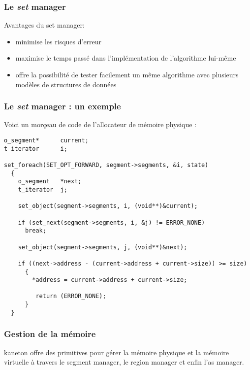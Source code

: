 
\begin{frame}
  \frametitle{Le \emph{set} manager}

  Avantages du set manager:

  \begin{itemize}
    \item
    minimise les risques d'erreur
    \item
    maximise le temps pass\'e dans l'impl\'ementation de l'algorithme
    lui-m\^eme
    \item
    offre la possibilit\'e de tester facilement un m\^eme algorithme avec
    plusieurs mod\`eles de structures de donn\'ees
  \end{itemize}

\end{frame}


\begin{frame}[containsverbatim]
  \frametitle{Le \emph{set} manager : un exemple}

  Voici un mor\c{c}eau de code de l'allocateur de m\'{e}moire physique :

  \begin{verbatim}
o_segment*      current;
t_iterator      i;

set_foreach(SET_OPT_FORWARD, segment->segments, &i, state)
  {
    o_segment   *next;
    t_iterator  j;

    set_object(segment->segments, i, (void**)&current);

    if (set_next(segment->segments, i, &j) != ERROR_NONE)
      break;

    set_object(segment->segments, j, (void**)&next);

    if ((next->address - (current->address + current->size)) >= size)
      {
        *address = current->address + current->size;

         return (ERROR_NONE);
      }
  }
  \end{verbatim}

\end{frame}


\begin{frame}
  \frametitle{Gestion de la m\'{e}moire}

  kaneton offre des primitives pour g\'{e}rer la m\'{e}moire physique et la
  m\'{e}moire virtuelle \`{a} travers le segment manager, le region manager et
  enfin l'as manager.

\end{frame}

